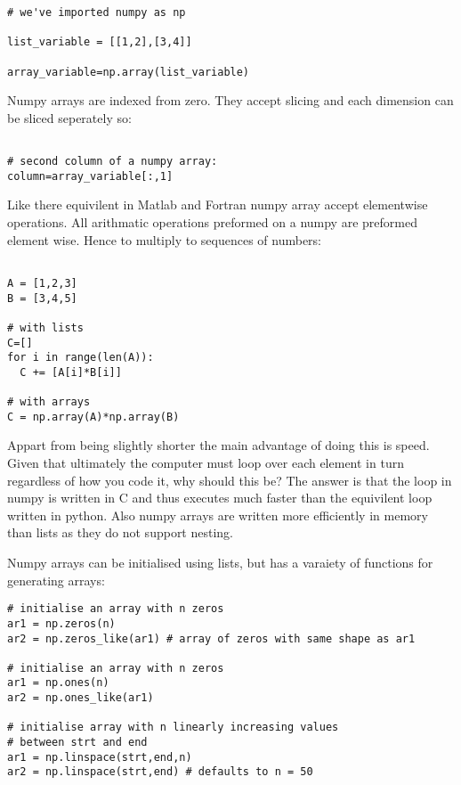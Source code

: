 \documentclass[11pt,a4paper]{article}
\begin{document}
\begin{verbatim}
# we've imported numpy as np

list_variable = [[1,2],[3,4]]

array_variable=np.array(list_variable)

\end{verbatim}

Numpy arrays are indexed from zero. They accept slicing and each dimension can be sliced seperately so:

\begin{verbatim}

# second column of a numpy array:
column=array_variable[:,1]

\end{verbatim}

Like there equivilent in Matlab and Fortran numpy array accept elementwise operations. All arithmatic operations preformed on a numpy are preformed element wise. Hence to multiply to sequences of numbers:

\begin{verbatim}

A = [1,2,3]
B = [3,4,5]

# with lists
C=[]
for i in range(len(A)):
  C += [A[i]*B[i]]

# with arrays
C = np.array(A)*np.array(B)

\end{verbatim}

Appart from being slightly shorter the main advantage of doing this is speed. Given that ultimately the computer must loop over each element in turn regardless of how you code it, why should this be? The answer is that the loop in numpy is written in C and thus executes much faster than the equivilent loop written in python. Also numpy arrays are written more efficiently in memory than lists as they do not support nesting.

Numpy arrays can be initialised using lists, but has a varaiety of functions for generating arrays:

\begin{verbatim}
# initialise an array with n zeros
ar1 = np.zeros(n)
ar2 = np.zeros_like(ar1) # array of zeros with same shape as ar1

# initialise an array with n zeros
ar1 = np.ones(n)
ar2 = np.ones_like(ar1) 

# initialise array with n linearly increasing values
# between strt and end  
ar1 = np.linspace(strt,end,n)
ar2 = np.linspace(strt,end) # defaults to n = 50

\end{verbatim}
\end{document}
